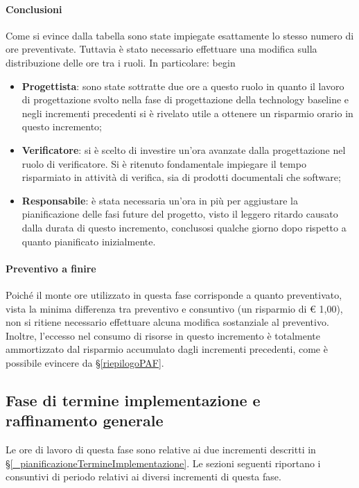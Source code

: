\paragraph{Conclusioni}
Come si evince dalla tabella sono state impiegate esattamente lo stesso numero di ore preventivate. Tuttavia è stato necessario effettuare una modifica sulla distribuzione delle ore tra i ruoli. In particolare:
begin\begin{itemize}
	\item \textbf{Progettista}: sono state sottratte due ore a questo ruolo in quanto il lavoro di progettazione svolto nella fase di progettazione della technology baseline e negli incrementi precedenti si è rivelato utile a ottenere un risparmio orario in questo incremento;
	\item \textbf{Verificatore}: si è scelto di investire un'ora avanzate dalla progettazione nel ruolo di verificatore. Si è ritenuto fondamentale impiegare il tempo risparmiato in attività di verifica, sia di prodotti documentali che software;
	\item \textbf{Responsabile}: è stata necessaria un'ora in più per aggiustare la pianificazione delle fasi future del progetto, visto il leggero ritardo causato dalla durata di questo incremento, conclusosi qualche giorno dopo rispetto a quanto pianificato inizialmente.
\end{itemize} 

\paragraph{Preventivo a finire}
Poiché il monte ore utilizzato in questa fase corrisponde a quanto preventivato, vista la minima differenza tra preventivo e consuntivo (un risparmio di € 1,00), non si ritiene necessario effettuare alcuna modifica sostanziale al preventivo. Inoltre, l'eccesso nel consumo di risorse in questo incremento è totalmente ammortizzato dal risparmio accumulato dagli incrementi precedenti, come è possibile evincere da \S\ref{riepilogoPAF}.

\subsection{Fase di termine implementazione e raffinamento generale} \label{_consuntivoTermine}
Le ore di lavoro di questa fase sono relative ai due incrementi descritti in \S\ref{_pianificazioneTermineImplementazione}.
Le sezioni seguenti riportano i consuntivi di periodo relativi ai diversi incrementi di questa fase.


